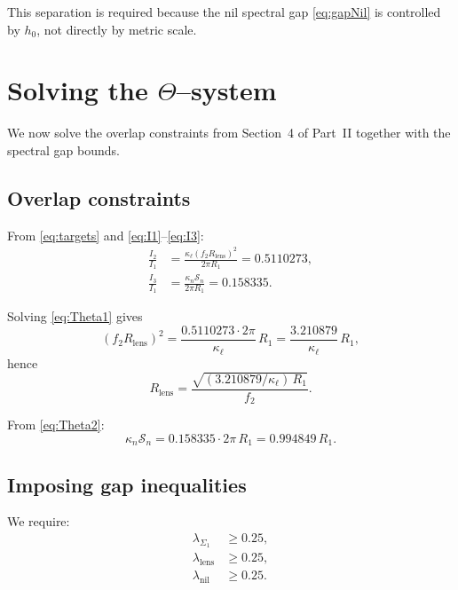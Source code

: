 \documentclass[11pt]{article}
\begin{document}
This separation is required because the nil spectral gap
\eqref{eq:gapNil} is controlled by $h_0$, not directly by metric scale.

\section{Solving the $\Theta$--system}

We now solve the overlap constraints from Section~4 of Part~II
together with the spectral gap bounds.

\subsection{Overlap constraints}

From \eqref{eq:targets} and \eqref{eq:I1}--\eqref{eq:I3}:
\begin{align}
\frac{I_2}{I_1}
&=
\frac{\kappa_\ell (f_2R_{\mathrm{lens}})^2}{2\pi R_1}
= 0.5110273,
\label{eq:Theta1}\\
\frac{I_3}{I_1}
&=
\frac{\kappa_n\mathcal{S}_n}{2\pi R_1}
= 0.158335.
\label{eq:Theta2}
\end{align}

Solving \eqref{eq:Theta1} gives
\begin{equation}
(f_2R_{\mathrm{lens}})^2
=
\frac{0.5110273\cdot 2\pi}{\kappa_\ell}\,R_1
=
\frac{3.210879}{\kappa_\ell}\,R_1,
\label{eq:RlSolve}
\end{equation}
hence
\begin{equation}
R_{\mathrm{lens}}
=
\frac{\sqrt{(3.210879/\kappa_\ell)\,R_1}}{f_2}.
\label{eq:RlFinal}
\end{equation}

From \eqref{eq:Theta2}:
\begin{equation}
\kappa_n\mathcal{S}_n
=
0.158335\cdot 2\pi\,R_1
=
0.994849\,R_1.
\label{eq:SnSolve}
\end{equation}

\subsection{Imposing gap inequalities}

We require:
\begin{align}
\lambda_{\Sigma_1} &\ge 0.25,
\label{eq:gap1}\\
\lambda_{\mathrm{lens}} &\ge 0.25,
\label{eq:gap2}\\
\lambda_{\mathrm{nil}} &\ge 0.25.
\label{eq:gap3}
\end{align}
\end{document}
